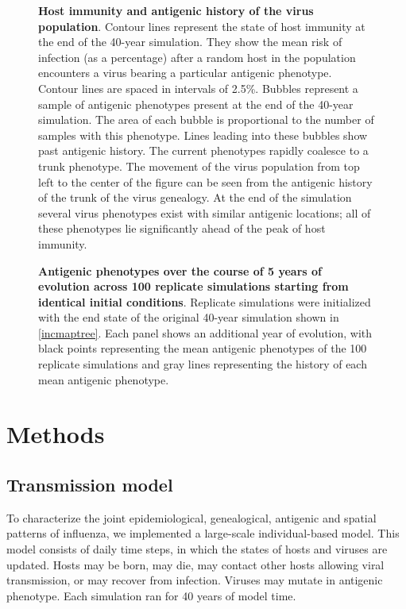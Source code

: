 \begin{figure}[H]
	\centering
	\caption{\textbf{Host immunity and antigenic history of the virus population}.  Contour lines represent the state of host immunity at the end of the 40-year simulation.  They show the mean risk of infection (as a percentage) after a random host in the population encounters a virus bearing a particular antigenic phenotype.  Contour lines are spaced in intervals of 2.5\%. Bubbles represent a sample of antigenic phenotypes present at the end of the 40-year simulation.  The area of each bubble is proportional to the number of samples with this phenotype.  Lines leading into these bubbles show past antigenic history.  The current phenotypes rapidly coalesce to a trunk phenotype.  The movement of the virus population from top left to the center of the figure can be seen from the antigenic history of the trunk of the virus genealogy. At the end of the simulation several virus phenotypes exist with similar antigenic locations; all of these phenotypes lie significantly ahead of the peak of host immunity.}
	\label{immunity}
\end{figure}

\begin{figure}[H]
	\centering
	\caption{\textbf{Antigenic phenotypes over the course of 5 years of evolution across 100 replicate simulations starting from identical initial conditions}.  Replicate simulations were initialized with the end state of the original 40-year simulation shown in \ref{incmaptree}.  Each panel shows an additional year of evolution, with black points representing the mean antigenic phenotypes of the 100 replicate simulations and gray lines representing the history of each mean antigenic phenotype.}
	\label{replicateevol}
\end{figure}

\section*{Methods}

\subsection*{Transmission model}

To characterize the joint epidemiological, genealogical, antigenic and spatial patterns of influenza, we implemented a large-scale individual-based model.  This model consists of daily time steps, in which the states of hosts and viruses are updated.  Hosts may be born, may die, may contact other hosts allowing viral transmission, or may recover from infection.  Viruses may mutate in antigenic phenotype.  Each simulation ran for 40 years of model time.  

